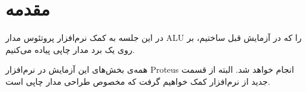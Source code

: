 \documentclass[a4paper,oneside,12pt]{book}
\title{\thesistitle}
\author{\authorname}
\begin{document}

\doublespacing

\newpage
\chapter{مقدمه}
در این جلسه
به کمک نرم‌افزار پروتئوس مدار
ALU
را که در آزمایش قبل ساختیم، بر روی یک برد مدار چاپی
پیاده می‌کنیم.
 
 همه‌ی بخش‌های این آزمایش در نرم‌افزار
 Proteus
 انجام خواهد شد.
 البته از قسمت جدید از نرم‌افزار کمک خواهیم گرفت که مخصوص طراحی مدار چاپی است.

\newpage \tableofcontents

\mainmatter

\end{document}
